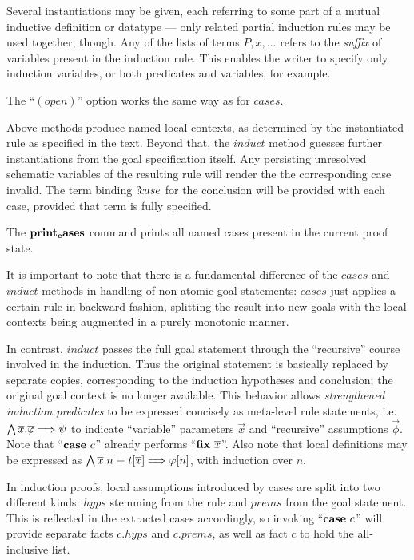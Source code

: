 \begin{descr}
  Several instantiations may be given, each referring to some part of a mutual
  inductive definition or datatype --- only related partial induction rules
  may be used together, though.  Any of the lists of terms $P, x, \dots$
  refers to the \emph{suffix} of variables present in the induction rule.
  This enables the writer to specify only induction variables, or both
  predicates and variables, for example.

  The ``$(open)$'' option works the same way as for $cases$.

\end{descr}

Above methods produce named local contexts, as determined by the instantiated
rule as specified in the text.  Beyond that, the $induct$ method guesses
further instantiations from the goal specification itself.  Any persisting
unresolved schematic variables of the resulting rule will render the the
corresponding case invalid.  The term binding ${?\!case}$
for the conclusion will be provided with each case, provided that term is
fully specified.

The ${\mathord{\mathbf{print_cases}}}$ command prints all named cases present in the
current proof state.

\medskip

It is important to note that there is a fundamental difference of the $cases$
and $induct$ methods in handling of non-atomic goal statements: $cases$ just
applies a certain rule in backward fashion, splitting the result into new
goals with the local contexts being augmented in a purely monotonic manner.

In contrast, $induct$ passes the full goal statement through the
``recursive'' course involved in the induction.  Thus the original statement
is basically replaced by separate copies, corresponding to the induction
hypotheses and conclusion; the original goal context is no longer available.
This behavior allows \emph{strengthened induction predicates} to be expressed
concisely as meta-level rule statements, i.e.\ $\bigwedge\overline{x}. \overline{\varphi} \Longrightarrow
\psi$ to indicate ``variable'' parameters $\vec x$ and ``recursive''
assumptions $\vec\phi$. Note that ``${\mathord{\mathbf{case}}}~c$'' already performs
``${\mathord{\mathbf{fix}}}~\overline{x}$''.  Also note that local definitions may be expressed as
$\bigwedge\overline{x}. n \equiv t[\overline{x}] \Longrightarrow \varphi[n]$, with induction over $n$.


In induction proofs, local assumptions introduced by cases are split into two
different kinds: $hyps$ stemming from the rule and $prems$ from the goal
statement.  This is reflected in the extracted cases accordingly, so invoking
``${\mathord{\mathbf{case}}}~c$'' will provide separate facts $c\mathord.hyps$ and
$c\mathord.prems$, as well as fact $c$ to hold the all-inclusive list.

